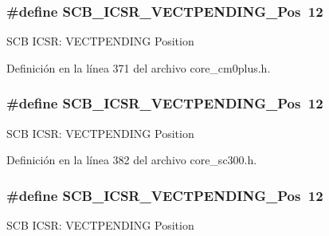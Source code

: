 \subsubsection[{\texorpdfstring{S\+C\+B\+\_\+\+I\+C\+S\+R\+\_\+\+V\+E\+C\+T\+P\+E\+N\+D\+I\+N\+G\+\_\+\+Pos}{SCB_ICSR_VECTPENDING_Pos}}]{\setlength{\rightskip}{0pt plus 5cm}\#define S\+C\+B\+\_\+\+I\+C\+S\+R\+\_\+\+V\+E\+C\+T\+P\+E\+N\+D\+I\+N\+G\+\_\+\+Pos~12}\hypertarget{group___c_m_s_i_s___s_c_b_gada60c92bf88d6fd21a8f49efa4a127b8}{}\label{group___c_m_s_i_s___s_c_b_gada60c92bf88d6fd21a8f49efa4a127b8}
S\+CB I\+C\+SR\+: V\+E\+C\+T\+P\+E\+N\+D\+I\+NG Position 

Definición en la línea 371 del archivo core\+\_\+cm0plus.\+h.

\subsubsection[{\texorpdfstring{S\+C\+B\+\_\+\+I\+C\+S\+R\+\_\+\+V\+E\+C\+T\+P\+E\+N\+D\+I\+N\+G\+\_\+\+Pos}{SCB_ICSR_VECTPENDING_Pos}}]{\setlength{\rightskip}{0pt plus 5cm}\#define S\+C\+B\+\_\+\+I\+C\+S\+R\+\_\+\+V\+E\+C\+T\+P\+E\+N\+D\+I\+N\+G\+\_\+\+Pos~12}\hypertarget{group___c_m_s_i_s___s_c_b_gada60c92bf88d6fd21a8f49efa4a127b8}{}\label{group___c_m_s_i_s___s_c_b_gada60c92bf88d6fd21a8f49efa4a127b8}
S\+CB I\+C\+SR\+: V\+E\+C\+T\+P\+E\+N\+D\+I\+NG Position 

Definición en la línea 382 del archivo core\+\_\+sc300.\+h.

\subsubsection[{\texorpdfstring{S\+C\+B\+\_\+\+I\+C\+S\+R\+\_\+\+V\+E\+C\+T\+P\+E\+N\+D\+I\+N\+G\+\_\+\+Pos}{SCB_ICSR_VECTPENDING_Pos}}]{\setlength{\rightskip}{0pt plus 5cm}\#define S\+C\+B\+\_\+\+I\+C\+S\+R\+\_\+\+V\+E\+C\+T\+P\+E\+N\+D\+I\+N\+G\+\_\+\+Pos~12}\hypertarget{group___c_m_s_i_s___s_c_b_gada60c92bf88d6fd21a8f49efa4a127b8}{}\label{group___c_m_s_i_s___s_c_b_gada60c92bf88d6fd21a8f49efa4a127b8}
S\+CB I\+C\+SR\+: V\+E\+C\+T\+P\+E\+N\+D\+I\+NG Position 


